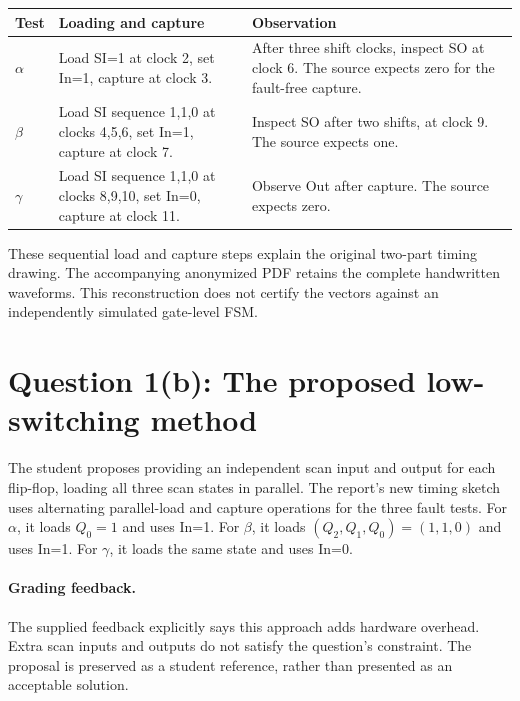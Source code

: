 \documentclass[11pt,a4paper]{article}
\begin{document}
\begin{center}\begin{tabular}{p{18mm}>{\raggedright\arraybackslash}p{52mm}>{\raggedright\arraybackslash}p{67mm}}
\toprule Test & Loading and capture & Observation\\\midrule
$\alpha$ & Load SI=1 at clock 2, set In=1, capture at clock 3. & After three shift clocks, inspect SO at clock 6. The source expects zero for the fault-free capture.\\
$\beta$ & Load SI sequence 1,1,0 at clocks 4,5,6, set In=1, capture at clock 7. & Inspect SO after two shifts, at clock 9. The source expects one.\\
$\gamma$ & Load SI sequence 1,1,0 at clocks 8,9,10, set In=0, capture at clock 11. & Observe Out after capture. The source expects zero.\\
\bottomrule\end{tabular}\end{center}
These sequential load and capture steps explain the original two-part timing drawing. The accompanying anonymized PDF retains the complete handwritten waveforms. This reconstruction does not certify the vectors against an independently simulated gate-level FSM.

\section{Question 1(b): The proposed low-switching method}
The student proposes providing an independent scan input and output for each flip-flop, loading all three scan states in parallel. The report's new timing sketch uses alternating parallel-load and capture operations for the three fault tests. For $\alpha$, it loads $Q_0=1$ and uses In=1. For $\beta$, it loads $(Q_2,Q_1,Q_0)=(1,1,0)$ and uses In=1. For $\gamma$, it loads the same state and uses In=0.
\paragraph{Grading feedback.}
The supplied feedback explicitly says this approach adds hardware overhead. Extra scan inputs and outputs do not satisfy the question's constraint. The proposal is preserved as a student reference, rather than presented as an acceptable solution.
\end{document}
